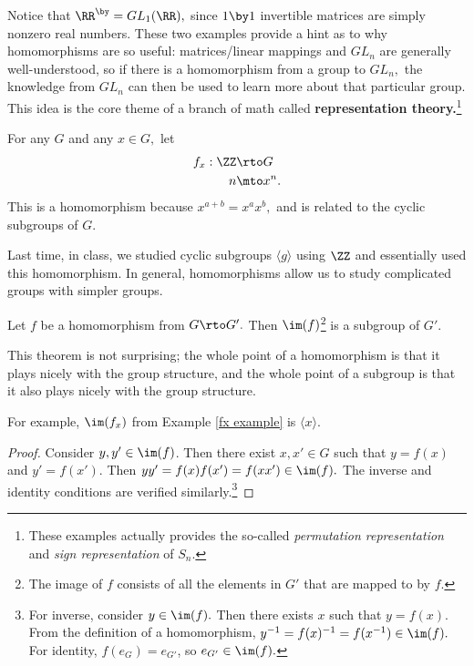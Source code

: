 Notice that $\RR^{\by} = GL_1(\RR),$ since $1 \by 1$ invertible matrices are simply nonzero real numbers. These two examples provide a hint as to why homomorphisms are so useful: matrices/linear mappings and $GL_n$ are generally well-understood, so if there is a homomorphism from a group to $GL_n,$ the knowledge from $GL_n$ can then be used to learn more about that particular group. This idea is the core theme of a branch of math called \textbf{representation theory.}\footnote{These examples actually provides the so-called \emph{permutation representation} and \emph{sign representation} of $S_n$.}

\begin{example}\label{fx example}
For any $G$ and any $x \in G,$ let 
\begin{align*}
    f_x: \ZZ &\rto G \\
    n &\mto x^n.
\end{align*}
This is a homomorphism because $x^{a + b} = x^ax^b,$ and is related to the cyclic subgroups of $G.$
\end{example}
Last time, in class, we studied cyclic subgroups $\langle g \rangle$ using $\ZZ$ and essentially used this homomorphism. In general, homomorphisms allow us to study complicated groups with simpler groups.

\begin{theorem}
Let $f$ be a homomorphism from $G \rto G'.$ Then $\im(f)$\footnote{The image of $f$ consists of all the elements in $G'$ that are mapped to by $f.$} is a subgroup of $G'.$
\end{theorem}

This theorem is not surprising; the whole point of a homomorphism is that it plays nicely with the group structure, and the whole point of a subgroup is that it also plays nicely with the group structure.
\begin{example}
For example, $\im(f_x)$ from Example \ref{fx example} is $\langle x \rangle.$
\end{example}

\begin{proof}
Consider $y, y' \in \im(f)$. Then there exist $x, x'\in G$ such that $y = f(x)$ and $y' = f(x').$ Then $yy' = f(x)f(x') = f(xx') \in \im(f).$ The inverse and identity conditions are verified similarly.\footnote{For inverse, consider $y \in \im(f).$ Then there exists $x$ such that $y = f(x).$ From the definition of a homomorphism, $y^{-1} = f(x)^{-1} = f(x^{-1}) \in \im(f).$ For identity, $f(e_G) = e_{G'}$, so $e_{G'} \in \im(f).$}
\end{proof}


